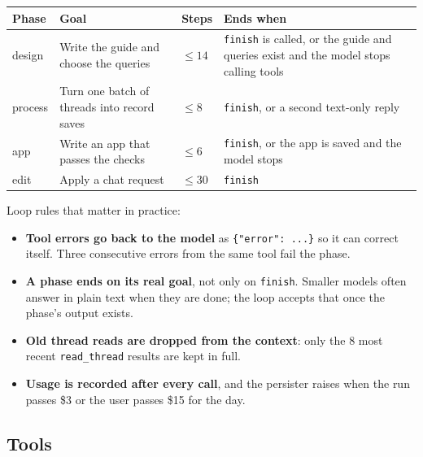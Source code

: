 \documentclass[10pt,a4paper]{article}
\newcommand{\code}[1]{\texttt{\small #1}}
\newcommand{\usd}[1]{\$#1}
\begin{document}
\begin{center}\small
\begin{tabularx}{\linewidth}{@{}P{1.5cm}P{3.5cm}P{1.3cm}L@{}}
\toprule
\textbf{Phase} & \textbf{Goal} & \textbf{Steps} & \textbf{Ends when} \\
\midrule
design & Write the guide and choose the queries & $\le 14$ & \code{finish} is called, or the guide and queries exist and the model stops calling tools \\
process & Turn one batch of threads into record saves & $\le 8$ & \code{finish}, or a second text-only reply \\
app & Write an app that passes the checks & $\le 6$ & \code{finish}, or the app is saved and the model stops \\
edit & Apply a chat request & $\le 30$ & \code{finish} \\
\bottomrule
\end{tabularx}
\end{center}

Loop rules that matter in practice:
\begin{itemize}
\item \textbf{Tool errors go back to the model} as \code{\{"error": ...\}} so it can correct itself. Three consecutive errors from the same tool fail the phase.
\item \textbf{A phase ends on its real goal}, not only on \code{finish}. Smaller models often answer in plain text when they are done; the loop accepts that once the phase's output exists.
\item \textbf{Old thread reads are dropped from the context}: only the 8 most recent \code{read\_thread} results are kept in full.
\item \textbf{Usage is recorded after every call}, and the persister raises when the run passes \usd{3} or the user passes \usd{15} for the day.
\end{itemize}

\subsection{Tools}
\end{document}

